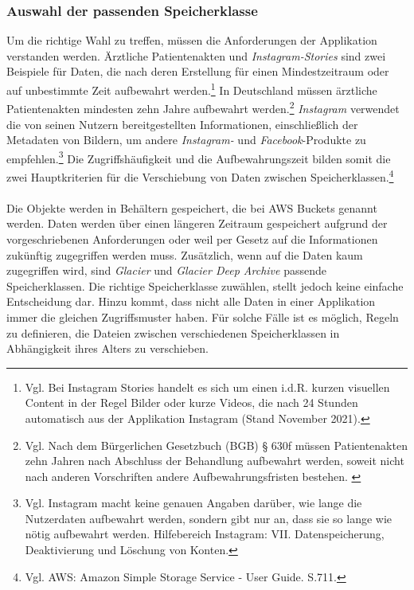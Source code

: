 \subsubsection{Auswahl der passenden Speicherklasse}%
Um die richtige Wahl zu treffen, müssen die Anforderungen der Applikation verstanden werden. Ärztliche Patientenakten und \textit{Instagram-Stories} sind zwei Beispiele für Daten, die nach deren Erstellung für einen Mindestzeitraum oder auf unbestimmte Zeit aufbewahrt %
werden.\footnote{Vgl. Bei Instagram Stories handelt es sich um einen i.d.R. kurzen visuellen Content in der Regel Bilder oder kurze Videos, die nach 24 Stunden automatisch aus der Applikation Instagram  (Stand November 2021).\cite{IG2}} In Deutschland müssen ärztliche Patientenakten mindesten zehn Jahre aufbewahrt werden.\footnote{Vgl. Nach dem Bürgerlichen Gesetzbuch (BGB) § 630f müssen Patientenakten zehn Jahren nach Abschluss der Behandlung aufbewahrt werden, soweit nicht nach anderen Vorschriften andere Aufbewahrungsfristen bestehen. \cite{BGB}} \textit{Instagram} verwendet die von seinen Nutzern bereitgestellten Informationen, einschließlich der Metadaten von Bildern, um andere \textit{Instagram-} und \textit{Facebook}-Produkte zu empfehlen.\footnote{Vgl. Instagram macht keine genauen Angaben darüber, wie lange die Nutzerdaten aufbewahrt werden, sondern gibt nur an, dass sie so lange wie nötig aufbewahrt werden. Hilfebereich Instagram: VII. Datenspeicherung, Deaktivierung und Löschung von Konten\cite{IG3}.}
Die Zugriffshäufigkeit und die Aufbewahrungszeit bilden somit die zwei Hauptkriterien für die Verschiebung von Daten zwischen Speicherklassen.\footnote{Vgl. AWS: Amazon Simple Storage Service - User Guide. S.711.\cite{AMZ18}}
\\\\
Die Objekte werden in Behältern gespeichert, die bei AWS Buckets genannt werden. Daten werden über einen längeren Zeitraum gespeichert aufgrund der vorgeschriebenen Anforderungen oder weil per Gesetz auf die Informationen zukünftig zugegriffen werden muss.
Zusätzlich, wenn auf die Daten kaum zugegriffen wird, sind \textit{Glacier} und \textit{Glacier Deep Archive} passende Speicherklassen. Die richtige Speicherklasse zuwählen, stellt jedoch keine einfache Entscheidung dar. %
Hinzu kommt, dass nicht alle Daten in einer Applikation immer die gleichen Zugriffsmuster haben. Für solche Fälle ist es möglich, Regeln zu definieren, die Dateien zwischen verschiedenen Speicherklassen in Abhängigkeit ihres Alters zu verschieben.
\newpage
